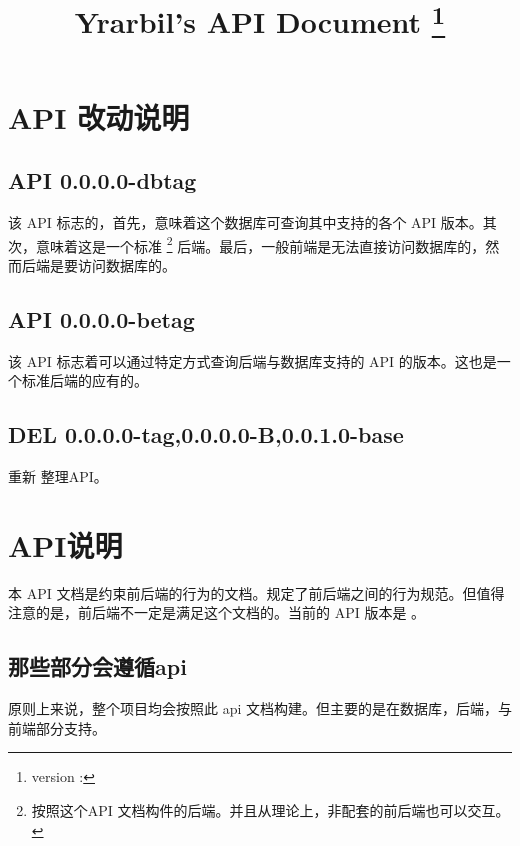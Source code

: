 \documentclass[UTF8]{article}
\title{Yrarbil's API Document \thanks{version : \apiver}}
\begin{document}
    \maketitle
    \newpage
    
    \tableofcontents
    \newpage


    \section{API 改动说明}

    \subsection{API 0.0.0.0-dbtag}
    该 API 标志的，首先，意味着这个数据库可查询其中支持的各个 API 版本。其次，意味着这是一个标准
      \footnote{按照这个API 文档构件的后端。并且从理论上，非配套的前后端也可以交互。}
    后端。最后，一般前端是无法直接访问数据库的，然而后端是要访问数据库的。

    \subsection{API 0.0.0.0-betag}
    该 API 标志着可以通过特定方式查询后端与数据库支持的 API 的版本。这也是一个标准后端的应有的。

    \subsection{DEL 0.0.0.0-tag,0.0.0.0-B,0.0.1.0-base}
    重新 整理API。

    \section{API说明}
    本 API 文档是约束前后端的行为的文档。规定了前后端之间的行为规范。但值得注意的是，前后端不一定是满足这个文档的。当前的 API 版本是 \apiver 。
    \subsection{那些部分会遵循api}
    原则上来说，整个项目均会按照此 api 文档构建。但主要的是在数据库，后端，与前端部分支持。
\end{document}
